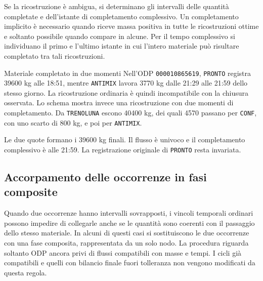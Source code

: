 Se la ricostruzione è ambigua, si determinano gli intervalli delle quantità completate e dell'istante di completamento complessivo. Un completamento implicito è necessario quando riceve massa positiva in tutte le ricostruzioni ottime e soltanto possibile quando compare in alcune. Per il tempo complessivo si individuano il primo e l'ultimo istante in cui l'intero materiale può risultare completato tra tali ricostruzioni.

\begingroup
{}
\begin{examplebox}{Materiale completato in due momenti}
Nell'ODP \texttt{000010865619}, \texttt{PRONTO} registra \num{39600} kg alle 18:51, mentre \texttt{ANTIMIX} lavora 3770 kg dalle 21:29 alle 21:59 dello stesso giorno. La ricostruzione ordinaria è quindi incompatibile con la chiusura osservata. Lo schema mostra invece una ricostruzione con due momenti di completamento. Da \texttt{TRENOLUNA} escono \num{40400} kg, dei quali 4570 passano per \texttt{CONF}, con uno scarto di 800 kg, e poi per \texttt{ANTIMIX}.

\begin{center}

\end{center}

Le due quote formano i \num{39600} kg finali. Il flusso è univoco e il completamento complessivo è alle 21:59. La registrazione originale di \texttt{PRONTO} resta invariata.
\end{examplebox}
\endgroup

\subsection{Accorpamento delle occorrenze in fasi composite}
\label{sec:composite-phases}

Quando due occorrenze hanno intervalli sovrapposti, i vincoli temporali ordinari possono impedire di collegarle anche se le quantità sono coerenti con il passaggio dello stesso materiale. In alcuni di questi casi si sostituiscono le due occorrenze con una fase composita, rappresentata da un solo nodo. La procedura riguarda soltanto ODP ancora privi di flussi compatibili con masse e tempi. I cicli già compatibili e quelli con bilancio finale fuori tolleranza non vengono modificati da questa regola.

